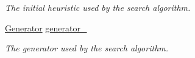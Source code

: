 \begin{DoxyCompactItemize}
\begin{DoxyCompactList}\small\item\em The initial heuristic used by the search algorithm. \end{DoxyCompactList}\item 
\hyperlink{structAlgorithm_ae48d359026f66d7f6c0d15d964a0e8bd}{Generator} \hyperlink{structAlgorithm_ac8583a46ec25965c9b5a043d4fbf9fc5}{generator\+\_\+}\hypertarget{structAlgorithm_ac8583a46ec25965c9b5a043d4fbf9fc5}{}\label{structAlgorithm_ac8583a46ec25965c9b5a043d4fbf9fc5}

\begin{DoxyCompactList}\small\item\em The generator used by the search algorithm. \end{DoxyCompactList}\end{DoxyCompactItemize}
